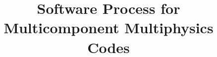 \documentclass[sunil1]{sunil} %
\begin{document}
\title{Software Process for Multicomponent Multiphysics
  Codes}

\tableofcontents
%
%
%
%

\mainmatter





\end{document}
